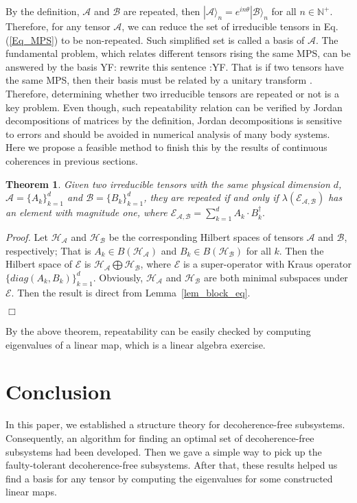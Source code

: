 \documentclass[journal]{IEEEtran}
\def\h{\ensuremath{\mathcal{H}}}
\def\a{\ensuremath{\mathcal{A}}}
\def\b{\ensuremath{\mathcal{B}}}
\def\e{\ensuremath{\mathcal{E}}}
\newtheorem{theorem}{Theorem}
\newcommand{\authorComment}[3]{\color{#1}#2: {#3} :#2\color{black}}
\newcommand{\yf}[1]{\authorComment{blue}{YF}{#1}}
\begin{document}
By the definition, $\a$ and $\b$ are repeated, then $|\a\rangle_{n}=e^{in\theta}|\b\rangle_{n}$ for all $n\in \mathbb{N^+}$. Therefore, for any tensor $\a$, we can reduce the set of irreducible tensors  in Eq.(\ref{Eq_MPS}) to be non-repeated. Such simplified set is called a basis of $\a$. The fundamental problem, which relates different tensors rising the same MPS, can be answered by the basis \yf{rewrite this sentence}. That is if two tensors have the same MPS, then their basis must be related by a unitary transform \cite{cuevas2017irreducible}. Therefore, determining whether two irreducible tensors are  repeated or not  is a key problem. Even though, such repeatability relation can be verified by Jordan decompositions of matrices by the definition, Jordan decompositions is sensitive to errors and should be avoided in numerical analysis of many body systems. Here we propose a feasible method to finish this by the results of continuous coherences in previous sections. 
\begin{theorem}
  Given two irreducible tensors with the same physical dimension $d$, $\a=\{A_{k}\}_{k=1}^{d}$ and $\b=\{B_{k}\}_{k=1}^{d}$, they are repeated if and only if $\lambda(\e_{\a,\b})$ has an element with magnitude one, where $\e_{\a,\b}=\sum_{k=1}^d A_{k}\cdot B_{k}^\dagger.$
\end{theorem}
{\it Proof.} Let $\h_\a$ and $\h_\b$ be the corresponding Hilbert spaces of tensors $\a$ and $\b$, respectively; That is $A_k\in B(\h_\a)$ and $B_k\in B(\h_\b)$ for all $k$.  Then  the  Hilbert space of $\e$ is $\h_\a\bigoplus \h_\b$, where $\e$ is a super-operator with Kraus operator $\{diag(A_k,B_k)\}_{k=1}^d$. Obviously, $\h_\a$ and $\h_\b$ are both minimal subspaces under $\e$. Then the result is direct from Lemma~\ref{lem_block_eq}. 

\hfill $\Box$

By the above theorem, repeatability  can be easily checked by computing eigenvalues of a linear map, which is a linear algebra exercise.  
\section{Conclusion}
In this paper, we established a structure theory for decoherence-free subsystems. Consequently, an algorithm for finding an optimal set of decoherence-free subsystems had been developed. Then we gave a simple way to pick up the faulty-tolerant decoherence-free subsystems. After that, these results helped us find a basis for any tensor by computing the eigenvalues for some constructed linear maps. 
\end{document}
